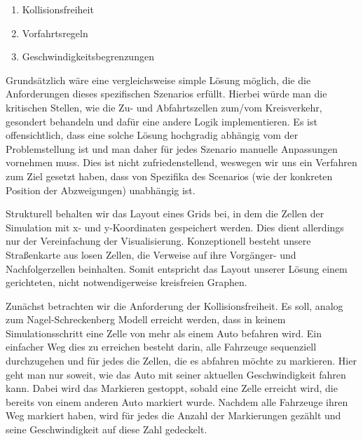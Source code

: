 \documentclass[11pt, a4paper]{article}
\begin{document}
\begin{enumerate}
	\item Kollisionsfreiheit
	\item Vorfahrtsregeln
	\item Geschwindigkeitsbegrenzungen
\end{enumerate}

Grundsätzlich wäre eine vergleichsweise simple Lösung möglich, die die Anforderungen dieses spezifischen Szenarios erfüllt. Hierbei würde man die kritischen Stellen, wie die Zu- und Abfahrtszellen zum/vom Kreisverkehr, gesondert behandeln und dafür eine andere Logik implementieren. Es ist offensichtlich, dass eine solche Lösung hochgradig abhängig vom der Problemstellung ist und man daher für jedes Szenario manuelle Anpassungen vornehmen muss. Dies ist nicht zufriedenstellend, weswegen wir uns ein Verfahren zum Ziel gesetzt haben, dass von Spezifika des Scenarios (wie der konkreten Position der Abzweigungen) unabhängig ist.

Strukturell behalten wir das Layout eines Grids bei, in dem die Zellen der Simulation mit x- und y-Koordinaten gespeichert werden. Dies dient allerdings nur der Vereinfachung der Visualisierung. Konzeptionell besteht unsere Straßenkarte aus losen Zellen, die Verweise auf ihre Vorgänger- und Nachfolgerzellen beinhalten. Somit entspricht das Layout unserer Lösung einem gerichteten, nicht notwendigerweise kreisfreien Graphen.

Zunächst betrachten wir die Anforderung der Kollisionsfreiheit. Es soll, analog zum Nagel-Schreckenberg Modell \cite{nagel-schreckenberg} erreicht werden, dass in keinem Simulationsschritt eine Zelle von mehr als einem Auto befahren wird. Ein einfacher Weg dies zu erreichen besteht darin, alle Fahrzeuge sequenziell durchzugehen und für jedes die Zellen, die es abfahren möchte zu markieren. Hier geht man nur soweit, wie das Auto mit seiner aktuellen Geschwindigkeit fahren kann. Dabei wird das Markieren gestoppt, sobald eine Zelle erreicht wird, die bereits von einem anderen Auto markiert wurde. Nachdem alle Fahrzeuge ihren Weg markiert haben, wird für jedes die Anzahl der Markierungen gezählt und seine Geschwindigkeit auf diese Zahl gedeckelt.
\end{document}
